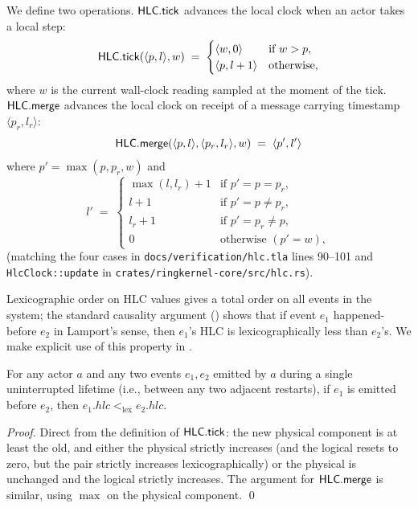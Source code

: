 We define two operations.  \(\mathsf{HLC}.\mathsf{tick}\) advances the local
clock when an actor takes a local step:
\[
\mathsf{HLC}.\mathsf{tick}(\langle p, l\rangle, w) \;=\;
  \begin{cases}
    \langle w, 0\rangle             & \text{if } w > p, \\
    \langle p, l + 1\rangle         & \text{otherwise,}
  \end{cases}
\]
where \(w\) is the current wall-clock reading sampled at the moment of
the tick.  \(\mathsf{HLC}.\mathsf{merge}\) advances the local clock on
receipt of a message carrying timestamp \(\langle p_r, l_r\rangle\):
\[
\mathsf{HLC}.\mathsf{merge}(\langle p, l\rangle,
                    \langle p_r, l_r\rangle, w) \;=\;
  \langle p', l'\rangle
\]
where \(p' = \max(p, p_r, w)\) and
\[
  l' \;=\;
  \begin{cases}
    \max(l, l_r) + 1 & \text{if } p' = p = p_r, \\
    l + 1            & \text{if } p' = p \neq p_r, \\
    l_r + 1          & \text{if } p' = p_r \neq p, \\
    0                & \text{otherwise } (p' = w),
  \end{cases}
\]
(matching the four cases in
\texttt{docs/verification/hlc.tla} lines 90--101 and \texttt{HlcClock::update}
in \texttt{crates/ringkernel-core/src/hlc.rs}).

Lexicographic order on HLC values gives a total order on all events
in the system; the standard causality argument
(\citet{kulkarni2014hlc}) shows that if event \(e_1\) happened-before
\(e_2\) in Lamport's sense, then \(e_1\)'s HLC is lexicographically
less than \(e_2\)'s.  We make explicit use of this property in
.

\begin{property}
\label{prop:hlc-per-actor-monotone}
For any actor \(a\) and any two events \(e_1, e_2\) emitted by \(a\)
during a single uninterrupted lifetime (i.e., between any two
adjacent restarts), if \(e_1\) is emitted before \(e_2\), then
\(e_1.\mathit{hlc} <_{\mathrm{lex}} e_2.\mathit{hlc}\).
\end{property}

\begin{proof}
Direct from the definition of \(\mathsf{HLC}.\mathsf{tick}\): the new
physical component is at least the old, and either the physical
strictly increases (and the logical resets to zero, but the pair
strictly increases lexicographically) or the physical is unchanged
and the logical strictly increases.  The argument for
\(\mathsf{HLC}.\mathsf{merge}\) is similar, using \(\max\) on the physical
component.
\qed
\end{proof}

